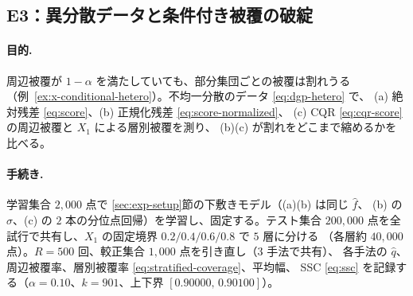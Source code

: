 \documentclass[a4paper,11pt]{jsarticle}
\theoremstyle{definition}
\theoremstyle{plain}
\theoremstyle{remark}
\newcommand{\qhat}{\hat{q}}
\newcommand{\fhat}{\hat{f}}
\newcommand{\encircle}[1]{\textcircled{\scriptsize #1}}   %
\begin{document}

\subsection{E3：異分散データと条件付き被覆の破綻}
\label{sec:e3}

\paragraph{目的.}
周辺被覆が $1-\alpha$ を満たしていても、部分集団ごとの被覆は割れうる
（例~\ref{ex:x-conditional-hetero}）。不均一分散のデータ \eqref{eq:dgp-hetero} で、
(a) 絶対残差 \eqref{eq:score}、(b) 正規化残差 \eqref{eq:score-normalized}、
(c) CQR \eqref{eq:cqr-score} の周辺被覆と $X_1$ による層別被覆を測り、
(b)(c) が割れをどこまで縮めるかを比べる。

\paragraph{手続き.}
学習集合 $2{,}000$ 点で \ref{sec:exp-setup}節の下敷きモデル（(a)(b) は同じ $\fhat$、
(b) の $\hat\sigma$、(c) の $2$ 本の分位点回帰）を学習し、固定する。テスト集合
$200{,}000$ 点を全試行で共有し、$X_1$ の固定境界 $0.2/0.4/0.6/0.8$ で $5$ 層に分ける
（各層約 $40{,}000$ 点）。$R=500$ 回、較正集合 $1{,}000$ 点を引き直し（$3$ 手法で共有）、
各手法の $\qhat$、周辺被覆率、層別被覆率 \eqref{eq:stratified-coverage}、平均幅、
SSC \eqref{eq:ssc} を記録する（$\alpha=0.10$、$k=901$、上下界 $[0.90000,\,0.90100]$）。
\end{document}

